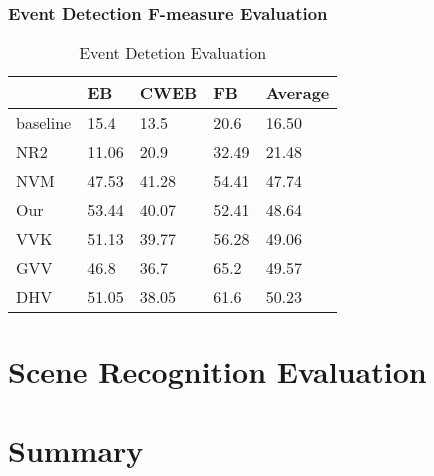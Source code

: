 \subsubsection{Event Detection F-measure Evaluation}
\begin{table}[htb]
\centering
\caption{Event Detetion Evaluation}
\begin{tabular}{lllll}
\hline
         & EB    & CWEB  & FB    & Average \\
\hline
baseline & 15.4  & 13.5  & 20.6  & 16.50   \\
NR2      & 11.06 & 20.9  & 32.49 & 21.48   \\
NVM      & 47.53 & 41.28 & 54.41 & 47.74   \\
Our      & 53.44 & 40.07 & 52.41 & 48.64   \\
VVK      & 51.13 & 39.77 & 56.28 & 49.06   \\
GVV      & 46.8  & 36.7  & 65.2  & 49.57   \\
DHV      & 51.05 & 38.05 & 61.6  & 50.23   \\     
\hline
\end{tabular}
\end{table}



\section{Scene Recognition Evaluation}

\section{Summary}
